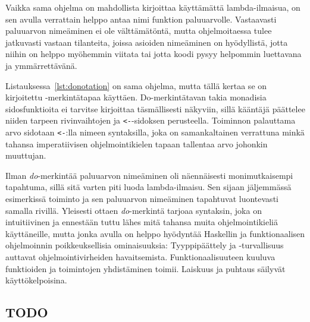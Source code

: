 \documentclass[finnish]{tktltiki2}
\begin{document}
Vaikka sama ohjelma on mahdollista kirjoittaa käyttämättä lambda-ilmaisua, on sen avulla verrattain
helppo antaa nimi funktion  paluuarvolle. Vastaavasti paluuarvon nimeäminen ei ole
välttämätöntä, mutta ohjelmoitaessa tulee jatkuvasti vastaan tilanteita, joissa asioiden nimeäminen
on hyödyllistä, jotta niihin on helppo myöhemmin viitata tai jotta koodi pysyy helpommin luettavana
ja ymmärrettävänä.

Listauksessa~\ref{lst:donotation} on sama ohjelma, mutta tällä kertaa se on kirjoitettu
-merkintätapaa käyttäen. Do-merkintätavan takia monadisia sidosfunktioita ei tarvitse
kirjoittaa täsmällisesti näkyviin, sillä kääntäjä päättelee niiden tarpeen rivinvaihtojen ja
\verb|<-|-sidoksen perusteella. Toiminnon  palauttama arvo sidotaan \verb|<-|:lla
nimeen syntaksilla, joka on samankaltainen verrattuna minkä tahansa imperatiivisen ohjelmointikielen
tapaan tallentaa arvo johonkin muuttujan.


Ilman \emph{do}-merkintää paluuarvon nimeäminen oli näennäisesti monimutkaisempi tapahtuma, sillä
sitä varten piti luoda lambda-ilmaisu. Sen sijaan jäljemmässä esimerkissä toiminto ja sen paluuarvon
nimeäminen tapahtuvat luontevasti samalla rivillä. Yleisesti ottaen \emph{do}-merkintä tarjoaa
syntaksin, joka on intuitiivinen ja ennestään tuttu lähes mitä tahansa muita ohjelmointikieliä
käyttäneille, mutta jonka avulla on helppo hyödyntää Haskellin ja funktionaalisen ohjelmoinnin
poikkeuksellisia ominaisuuksia: Tyyppipäättely ja -turvallisuus auttavat ohjelmointivirheiden
havaitsemista. Funktionaalisuuteen kuuluva funktioiden ja toimintojen yhdistäminen toimii. Laiskuus
ja puhtaus säilyvät käyttökelpoisina.




\subsection{TODO}


\end{document}

